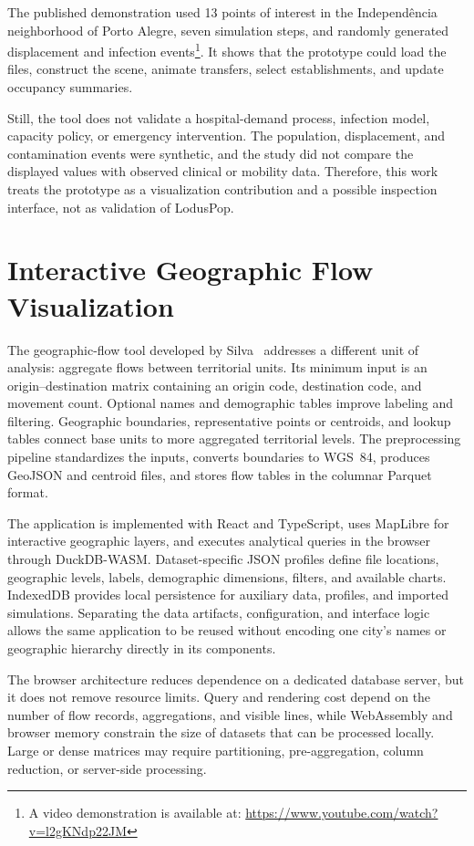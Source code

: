 The published demonstration used 13 points of interest in the Independ\^encia neighborhood of Porto Alegre, seven simulation steps, and randomly generated displacement and infection events\footnote{A video demonstration is available at: \url{https://www.youtube.com/watch?v=l2gKNdp22JM}}. It shows that the prototype could load the files, construct the scene, animate transfers, select establishments, and update occupancy summaries.

Still, the tool does not validate a hospital-demand process, infection model, capacity policy, or emergency intervention. The population, displacement, and contamination events were synthetic, and the study did not compare the displayed values with observed clinical or mobility data. Therefore, this work treats the prototype as a visualization contribution and a possible inspection interface, not as validation of LodusPop.

\section{Interactive Geographic Flow Visualization}
\label{visualization:od}

The geographic-flow tool developed by Silva~\cite{silva2026geospatial} addresses a different unit of analysis: aggregate flows between territorial units. Its minimum input is an origin--destination matrix containing an origin code, destination code, and movement count. Optional names and demographic tables improve labeling and filtering. Geographic boundaries, representative points or centroids, and lookup tables connect base units to more aggregated territorial levels. The preprocessing pipeline standardizes the inputs, converts boundaries to WGS~84, produces GeoJSON and centroid files, and stores flow tables in the columnar Parquet format.

The application is implemented with React and TypeScript, uses MapLibre for interactive geographic layers, and executes analytical queries in the browser through DuckDB-WASM. Dataset-specific JSON profiles define file locations, geographic levels, labels, demographic dimensions, filters, and available charts. IndexedDB provides local persistence for auxiliary data, profiles, and imported simulations. Separating the data artifacts, configuration, and interface logic allows the same application to be reused without encoding one city's names or geographic hierarchy directly in its components.

The browser architecture reduces dependence on a dedicated database server, but it does not remove resource limits. Query and rendering cost depend on the number of flow records, aggregations, and visible lines, while WebAssembly and browser memory constrain the size of datasets that can be processed locally. Large or dense matrices may require partitioning, pre-aggregation, column reduction, or server-side processing.

